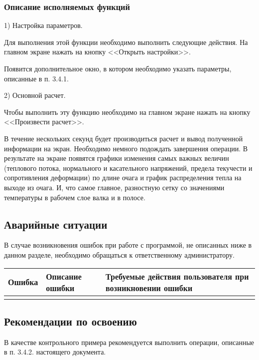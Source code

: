 \subsubsection{Описание исполняемых функций}

1) Настройка параметров.

Для выполнения этой функции необходимо выполнить следующие действия. На главном экране нажать на кнопку <<Открыть настройки>>.

Появится дополнительное окно, в котором необходимо указать параметры, описанные в п. 3.4.1.

2) Основной расчет.

Чтобы выполнить эту функцию необходимо на главном экране нажать на кнопку <<Произвести расчет>>.

В течение нескольких секунд будет производиться расчет и вывод полученной информации на экран. Необходимо немного подождать завершения операции. В результате на экране появятся графики изменения самых важных величин (теплового потока, нормального и касательного напряжений, предела текучести и сопротивления деформации) по длине очага и график распределения тепла на выходе из очага. И, что самое главное, разностную сетку со значениями температуры в рабочем слое валка и в полосе.

\subsection{Аварийные ситуации}
В случае возникновения ошибок при работе с программой, не описанных ниже в данном разделе, необходимо обращаться к ответственному администратору.
\begin{longtable}{|p{4cm}|p{4cm}|p{8cm}|}
\hline
Ошибка & Описание ошибки & Требуемые действия пользователя при возникновении ошибки\\
\hline
 &  &  & \\
\hline
\end{longtable}

\subsection{Рекомендации по освоению}
В качестве контрольного примера рекомендуется выполнить операции, описанные в п. 3.4.2. настоящего документа.

\newpage